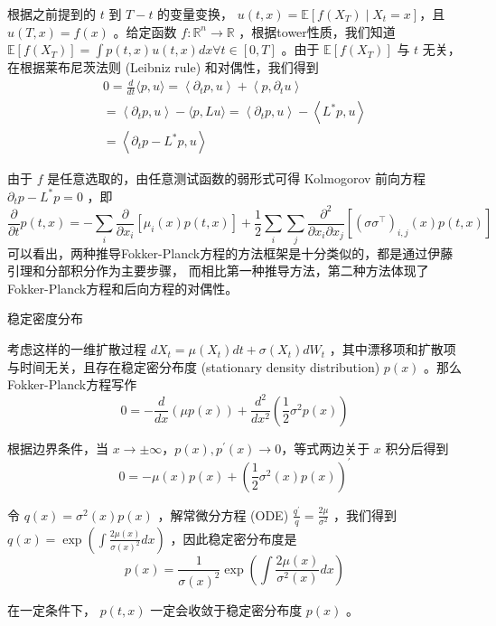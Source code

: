 根据之前提到的 $t$ 到 $T-t$ 的变量变换， $u(t,x)=\mathbb E[f(X_T)\mid X_t=x]$，且 $u(T,x)=f(x)$ 。给定函数 $f: \mathbb{R}^n \rightarrow \mathbb{R}$ ，根据tower性质，我们知道 $\mathbb{E}\left[f\left(X_T\right)\right]=\int p(t, x) u(t, x) d x \forall t \in[0, T]$ 。由于 $\mathbb{E}\left[f\left(X_T\right)\right]$ 与 $t$ 无关，在根据莱布尼茨法则 (Leibniz rule) 和对偶性，我们得到
$$
\begin{gathered}
0=\frac{d}{d t}\langle p, u\rangle=\left\langle\partial_t p, u\right\rangle+\left\langle p, \partial_t u\right\rangle \\
=\left\langle\partial_t p, u\right\rangle-\langle p, L u\rangle=\left\langle\partial_t p, u\right\rangle-\left\langle L^* p, u\right\rangle \\
=\left\langle\partial_t p-L^* p, u\right\rangle
\end{gathered}
$$

由于 $f$ 是任意选取的，由任意测试函数的弱形式可得 Kolmogorov 前向方程 $\partial_t p-L^*p=0$ ，即
$$
\frac{\partial}{\partial t} p(t, x)=-\sum_i \frac{\partial}{\partial x_i}\left[\mu_i(x) p(t, x)\right]+
\frac{1}{2} \sum_i \sum_j \frac{\partial^2}{\partial x_i \partial x_j}
\left[\left(\sigma \sigma^{\top}\right)_{i, j}(x) p(t, x)\right]
$$
可以看出，两种推导Fokker-Planck方程的方法框架是十分类似的，都是通过伊藤引理和分部积分作为主要步骤，
而相比第一种推导方法，第二种方法体现了Fokker-Planck方程和后向方程的对偶性。

稳定密度分布

考虑这样的一维扩散过程 $d X_t=\mu\left(X_t\right) d t+\sigma\left(X_t\right) d W_t$ ，其中漂移项和扩散项与时间无关，且存在稳定密分布度 (stationary density distribution) $p(x)$ 。那么Fokker-Planck方程写作
$$
0=-\frac{d}{d x}(\mu p(x))+\frac{d^2}{d x^2}\left(\frac{1}{2} \sigma^2 p(x)\right)
$$

根据边界条件，当 $x \rightarrow \pm\infty$，$p(x),p^{\prime}(x)\rightarrow0$，等式两边关于 $x$ 积分后得到
$$
0=-\mu(x) p(x)+\left(\frac{1}{2} \sigma^2(x) p(x)\right)^{\prime}
$$

令 $q(x)=\sigma^2(x) p(x)$ ，解常微分方程 (ODE) $\frac{q^{\prime}}{q}=\frac{2 \mu}{\sigma^2}$ ，我们得到 $q(x)=\exp \left(\int \frac{2 \mu(x)}{\sigma(x)^2} d x\right)$ ，因此稳定密分布度是
$$
p(x)=\frac{1}{\sigma(x)^2} \exp \left(\int \frac{2 \mu(x)}{\sigma^2(x)} d x\right)
$$




在一定条件下， $p(t, x)$ 一定会收敛于稳定密分布度 $p(x)$ 。


